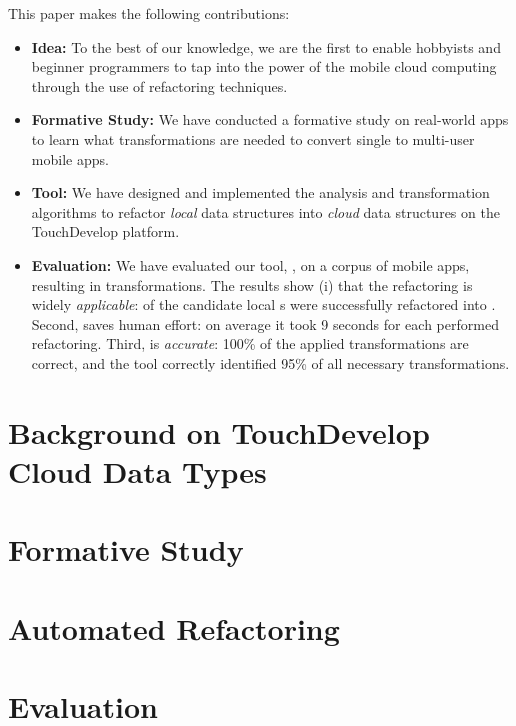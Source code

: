 \documentclass{sigplanconf}
\begin{document}
This paper makes the following contributions:
\begin{itemize}
\item{\textbf{Idea:}} To the best of our knowledge, we are the first to enable hobbyists and beginner programmers to tap into the power of the mobile cloud
computing through the use of refactoring techniques.

\item{\textbf{Formative Study:}} We have conducted a formative study on \numFormative real-world apps to learn what transformations are needed to convert single to multi-user mobile apps. 

\item{\textbf{Tool:}} We have designed and implemented the analysis and transformation algorithms to refactor \emph{local} data structures into \emph{cloud} data structures on the TouchDevelop platform. 

\item{\textbf{Evaluation:}} We have evaluated our tool, \tool, on a corpus of \numScripts mobile apps, resulting in \numTransformations transformations. The results show (i) that the refactoring is widely \emph{applicable}: \percentRefactored of the candidate local s were successfully refactored into . Second, \tool saves human effort: on average it took 9 seconds for each performed refactoring. Third, \tool is  
\emph{accurate}: 100\% of the applied transformations are correct, and the tool correctly identified 95\% of all necessary transformations.  
\end{itemize}

\section{Background on TouchDevelop Cloud Data Types}


\section{Formative Study}

\section{Automated Refactoring}

\section{Evaluation}
\end{document}
